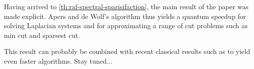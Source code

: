
Having arrived to \autoref{th:raf-spectral-sparisifaction}, the main result of
the paper was made explicit. Apers and de Wolf's algorithm thus yields a
quantum speedup for solving Laplacian systems and for approximating a range of
cut problems such as min cut and sparsest cut.

This result can probably be combined with recent classical results such as
\cite{chen_maximum_2022} to yield even faster algorithms. Stay tuned...